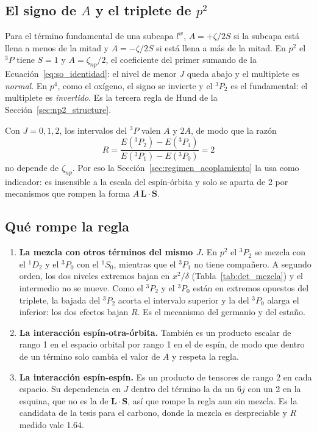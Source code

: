 \documentclass[11pt,a4paper]{article}
\begin{document}
\subsection{El signo de \texorpdfstring{$A$}{A} y el triplete de \texorpdfstring{$p^2$}{p2}}

Para el término fundamental de una subcapa $l^w$, $A = +\zeta/2S$ si la subcapa está llena a
menos de la mitad y $A = -\zeta/2S$ si está llena a más de la mitad. En $p^2$ el $^3P$ tiene
$S=1$ y $A = \zeta_{np}/2$, el coeficiente del primer sumando de la Ecuación~\eqref{eq:so_identidad}:
el nivel de menor $J$ queda abajo y el multiplete es \emph{normal}. En $p^4$, como el oxígeno, el
signo se invierte y el $^3P_2$ es el fundamental: el multiplete es \emph{invertido}. Es la tercera
regla de Hund de la Sección~\ref{sec:np2_structure}.

Con $J = 0, 1, 2$, los intervalos del $^3P$ valen $A$ y $2A$, de modo que la razón
\begin{equation}
  R = \frac{E(^3P_2) - E(^3P_1)}{E(^3P_1) - E(^3P_0)} = 2
\end{equation}
no depende de $\zeta_{np}$. Por eso la Sección~\ref{sec:regimen_acoplamiento} la usa como
indicador: es insensible a la escala del espín-órbita y solo se aparta de 2 por mecanismos que
rompen la forma $A\,\mathbf{L}\cdot\mathbf{S}$.

\subsection{Qué rompe la regla}

\begin{enumerate}
\item \textbf{La mezcla con otros términos del mismo $J$.} En $p^2$ el $^3P_2$ se mezcla con el
$^1D_2$ y el $^3P_0$ con el $^1S_0$, mientras que el $^3P_1$ no tiene compañero. A segundo orden,
los dos niveles extremos bajan en $x^2/\delta$ (Tabla~\ref{tab:det_mezcla}) y el intermedio no se
mueve. Como el $^3P_2$ y el $^3P_0$ están en extremos opuestos del triplete, la bajada del
$^3P_2$ acorta el intervalo superior y la del $^3P_0$ alarga el inferior: los dos efectos bajan
$R$. Es el mecanismo del germanio y del estaño.
\item \textbf{La interacción espín-otra-órbita.} También es un producto escalar de rango 1 en el
espacio orbital por rango 1 en el de espín, de modo que dentro de un término solo cambia el valor
de $A$ y respeta la regla.
\item \textbf{La interacción espín-espín.} Es un producto de tensores de rango 2 en cada espacio.
Su dependencia en $J$ dentro del término la da un $6j$ con un 2 en la esquina, que no es la de
$\mathbf{L}\cdot\mathbf{S}$, así que rompe la regla aun sin mezcla. Es la candidata de la tesis
para el carbono, donde la mezcla es despreciable y $R$ medido vale 1.64.
\end{enumerate}
\end{document}
